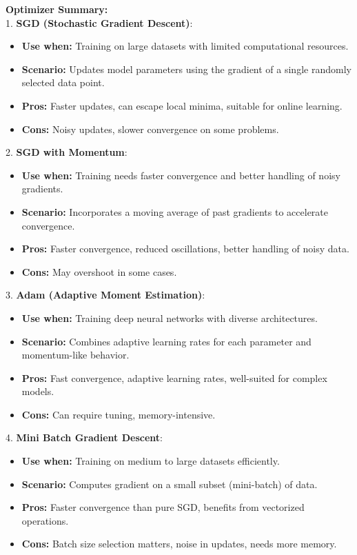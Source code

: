 \begin{idea}
    \textbf{Optimizer Summary:}\\

    1. \textbf{SGD (Stochastic Gradient Descent)}:
   \begin{itemize}
       \item \textbf{Use when:} Training on large datasets with limited computational resources.
       \item \textbf{Scenario:} Updates model parameters using the gradient of a single randomly selected data point.
       \item \textbf{Pros:} Faster updates, can escape local minima, suitable for online learning.
       \item \textbf{Cons:} Noisy updates, slower convergence on some problems.
   \end{itemize}

2. \textbf{SGD with Momentum}:
   \begin{itemize}
       \item \textbf{Use when:} Training needs faster convergence and better handling of noisy gradients.
       \item \textbf{Scenario:} Incorporates a moving average of past gradients to accelerate convergence.
       \item \textbf{Pros:} Faster convergence, reduced oscillations, better handling of noisy data.
       \item \textbf{Cons:} May overshoot in some cases.
   \end{itemize}

3. \textbf{Adam (Adaptive Moment Estimation)}:
   \begin{itemize}
       \item \textbf{Use when:} Training deep neural networks with diverse architectures.
       \item \textbf{Scenario:} Combines adaptive learning rates for each parameter and momentum-like behavior.
       \item \textbf{Pros:} Fast convergence, adaptive learning rates, well-suited for complex models.
       \item \textbf{Cons:} Can require tuning, memory-intensive.
   \end{itemize}

4. \textbf{Mini Batch Gradient Descent}:
   \begin{itemize}
       \item \textbf{Use when:} Training on medium to large datasets efficiently.
       \item \textbf{Scenario:} Computes gradient on a small subset (mini-batch) of data.
       \item \textbf{Pros:} Faster convergence than pure SGD, benefits from vectorized operations.
       \item \textbf{Cons:} Batch size selection matters, noise in updates, needs more memory.
   \end{itemize}
\end{idea}


